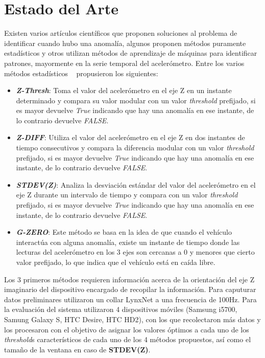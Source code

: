 \chapter{Estado del Arte}\label{chapter:state-of-the-art}

Existen varios artículos científicos que proponen soluciones al problema de identificar cuando hubo una anomalía, algunos proponen métodos
puramente estadísticos y otros utilizan métodos de aprendizaje de máquinas para identificar patrones, mayormente en la serie temporal del
acelerómetro. Entre los varios métodos estadísticos ~\cite{mednis2011real} propusieron los siguientes:\\

\begin{itemize}
	\item  \emph{\textbf {Z-Thresh}}: Toma el valor del acelerómetro en el eje Z en un instante determinado y compara su valor modular con
	      un valor \emph{threshold} prefijado, si es mayor devuelve \emph{True} indicando que hay una anomalía en ese instante, de lo contrario
	      devuelve {\it FALSE}.\\
	\item \emph{\textbf {Z-DIFF}}: Utiliza el valor del acelerómetro en el eje Z en dos instantes de tiempo consecutivos y compara la
	      diferencia modular con un valor \emph{threshold} prefijado, si es mayor devuelve \emph{True} indicando que hay una anomalía en ese
	      instante, de lo contrario devuelve {\it FALSE}.\\
	\item \emph{\textbf {STDEV(Z)}}: Analiza la desviación estándar del valor del acelerómetro en el eje Z durante un intervalo de
	      tiempo y compara con un valor \emph{threshold} prefijado, si es mayor devuelve \emph{True} indicando que hay una anomalía en ese
	      instante, de lo contrario devuelve {\it FALSE}.\\
	\item \emph{\textbf {G-ZERO}}: Este método se basa en la idea de que cuando el vehículo interactúa con alguna anomalía, existe un
	      instante de tiempo donde las lecturas del acelerómetro en los 3 ejes son cercanas a 0 y menores que cierto valor prefijado, lo que
	      indica que el vehículo está en caída libre.\\
\end{itemize}

Los 3 primeros métodos requieren información acerca de la orientación del eje Z imaginario del dispositivo encargado de recopilar la información.
Para caputurar datos preliminares utilizaron un collar LynxNet a una frecuencia de 100Hz. Para la evaluación del sistema utilizaron 4 dispositivos
móviles (Samsung i5700, Samung Galaxy S, HTC Desire, HTC HD2), con los que recolectaron más datos y los procesaron con el objetivo de asignar los
valores óptimos a cada uno de los \emph{threshold}s característicos de cada uno de los 4 métodos propuestos, así como el tamaño de la ventana en caso de
\textbf {STDEV(Z)}.\\


